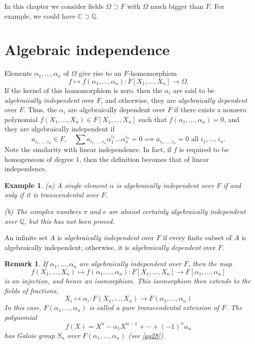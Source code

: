 \documentclass[a4paper,11pt,final,openany]{memoir}
\newtheorem{example}[X]{Example}
\newtheorem{remark}[X]{Remark}
\theoremstyle{nonumberplain}
\begin{document}
In this chapter we consider fields $\Omega\supset F$ with $\Omega$ much bigger
than $F$. For example, we could have $\mathbb{C}\supset\mathbb{Q}.$

\section{Algebraic independence}

Elements $\alpha_{1},...,\alpha_{n}$ of $\Omega$ give rise to an
$F$-homomorphism%
\[
f\mapsto f(\alpha_{1},...,\alpha_{n})\colon F[X_{1},\ldots,X_{n}%
]\rightarrow\Omega\text{.}%
\]
If the kernel of this homomorphism is zero, then the $\alpha_{i}$ are said to
be \emph{algebraically independent\/}\label{ai}%
over $F$, and otherwise, they are \emph{algebraically dependent}%
%
\emph{ }over $F$. Thus, the $\alpha_{i}$ are algebraically dependent over $F$
if there exists a nonzero polynomial $f(X_{1},...,X_{n})\in F[X_{1}%
,...,X_{n}]$ such that $f(\alpha_{1},...,\alpha_{n})=0$, and they are
algebraically independent if
\[
a_{i_{1},...,i_{n}}\in F,\quad\sum a_{i_{1},...,i_{n}}\alpha_{1}^{i_{1}%
}...\alpha_{n}^{i_{n}}=0\implies a_{i_{1},...,i_{n}}=0\text{\ all }%
i_{1},...,i_{n}.
\]
Note the similarity with linear independence. In fact, if $f$ is required to
be homogeneous of degree 1, then the definition becomes that of linear independence.

\begin{example}
\label{te1}(a) A single element $\alpha$ is algebraically independent over $F$
if and only if it is transcendental over $F.$

(b) The complex numbers $\pi$ and $e$ are almost certainly algebraically
independent over $\mathbb{Q}$, but this has not been proved.
\end{example}

An infinite set $A$ is \emph{algebraically independent\/} over $F$ if every
finite subset of $A$ is algebraically independent; otherwise, it is
\emph{algebraically dependent} over $F$.

\begin{remark}
\label{te2}If $\alpha_{1},...,\alpha_{n}$ are algebraically independent over
$F$, then the map
\[
f(X_{1},...,X_{n})\mapsto f(\alpha_{1},...,\alpha_{n})\colon F[X_{1}%
,...,X_{n}]\rightarrow F[\alpha_{1},...,\alpha_{n}]
\]
is an injection, and hence an isomorphism. This isomorphism then extends to
the fields of fractions,
\[
X_{i}\mapsto\alpha_{i}\colon F(X_{1},...,X_{n})\rightarrow F(\alpha
_{1},...,\alpha_{n})
\]
In this case, $F(\alpha_{1},...,\alpha_{n})$ is called a \emph{pure
transcendental } \emph{extension\/} of $F$. The polynomial
\[
f(X)=X^{n}-\alpha_{1}X^{n-1}+\cdots+(-1)^{n}\alpha_{n}%
\]
has Galois group $S_{n}$ over $F(\alpha_{1},...,\alpha_{n})$ (see \ref{ag28}).
\end{remark}
\end{document}
